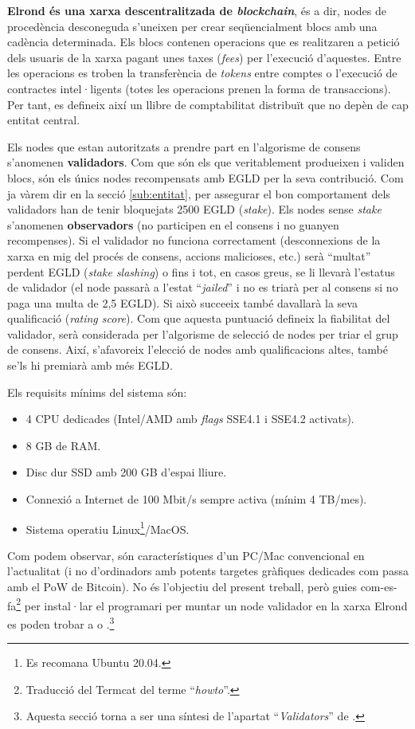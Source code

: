 \documentclass[11pt,a4paper]{article}
\begin{document}
\textbf{Elrond és una xarxa descentralitzada de \textit{blockchain}}, és a dir, nodes de procedència desconeguda s'uneixen per crear seqüencialment blocs amb una cadència determinada. Els blocs contenen operacions que es realitzaren a petició dels usuaris de la xarxa pagant unes taxes (\textit{fees}) per l'execució d'aquestes. Entre les operacions es troben la transferència de \textit{tokens} entre comptes o l'execució de contractes intel·ligents (totes les operacions prenen la forma de transaccions). Per tant, es defineix així un llibre de comptabilitat distribuït que no depèn de cap entitat central. 

Els nodes que estan autoritzats a prendre part en l'algorisme de consens s'anomenen \textbf{validadors}. Com que són els que veritablement produeixen i validen blocs, són els únics nodes recompensats amb EGLD per la seva contribució. Com ja vàrem dir en la secció \ref{sub:entitat}, per assegurar el bon comportament dels validadors han de tenir bloquejats 2500 EGLD (\textit{stake}). Els nodes sense \textit{stake} s'anomenen \textbf{observadors} (no participen en el consens i no guanyen recompenses). Si el validador no funciona correctament (desconnexions de la xarxa en mig del procés de consens, accions malicioses, etc.) serà ``multat'' perdent EGLD (\textit{stake slashing}) o fins i tot, en casos greus, se li llevarà l'estatus de validador (el node passarà a l'estat ``\textit{jailed}'' i no es triarà per al consens si no paga una multa de 2,5 EGLD).  Si això succeeix també davallarà la seva qualificació (\textit{rating score}). Com que aquesta puntuació defineix la fiabilitat del validador, serà considerada per l'algorisme de selecció de nodes per triar el grup de consens. Així, s'afavoreix l'elecció de nodes amb qualificacions altes, també se'ls hi premiarà amb més EGLD. 

Els requisits mínims del sistema són:
\begin{itemize}
\item 4 CPU dedicades (Intel/AMD amb \textit{flags} SSE4.1 i SSE4.2 activats).
\item 8 GB de RAM.
\item Disc dur SSD amb 200 GB d'espai lliure.
\item Connexió a Internet de 100 Mbit/s sempre activa (mínim 4 TB/mes).
\item Sistema operatiu Linux\footnote{Es recomana Ubuntu 20.04.}/MacOS.
\end{itemize}

Com podem observar, són característiques d'un PC/Mac convencional en l'actualitat (i no d'ordinadors amb potents targetes gràfiques dedicades com passa amb el PoW de Bitcoin). No és l'objectiu del present treball, però guies com-es-fa\footnote{Traducció del Termcat del terme ``\textit{howto}''.} per instal·lar el programari per muntar un node validador en la xarxa Elrond es poden trobar a \cite{elrond2022} o \cite{penalver2019}.\footnote{Aquesta secció torna a ser una síntesi de l'apartat ``\textit{Validators}'' de \cite{elrond2022}.}
\end{document}
